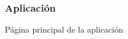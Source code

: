 \documentclass[14pt]{beamer}
\begin{document}
\begin{frame}
\frametitle{Aplicación}
Página principal de la aplicación
\begin{columns}
\begin{column}{0.25\textwidth}
\begin{center}


\end{center}
\end{column}

\end{columns}
\end{frame}
\end{document}
